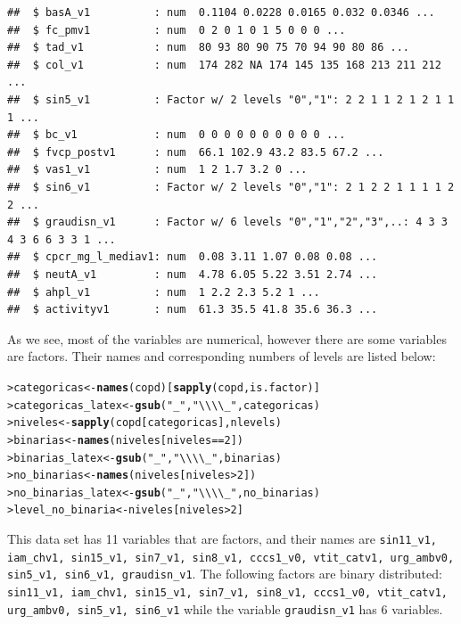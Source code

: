 \documentclass[10pt,a4paper,twoside]{article}\usepackage[]{graphicx}\usepackage[]{xcolor}
\makeatletter
\newcommand{\hlnum}[1]{\textcolor[rgb]{0.686,0.059,0.569}{#1}}%
\newcommand{\hlsng}[1]{\textcolor[rgb]{0.192,0.494,0.8}{#1}}%
\newcommand{\hlopt}[1]{\textcolor[rgb]{0,0,0}{#1}}%
\newcommand{\hldef}[1]{\textcolor[rgb]{0.345,0.345,0.345}{#1}}%
\newcommand{\hlkwb}[1]{\textcolor[rgb]{0.69,0.353,0.396}{#1}}%
\newcommand{\hlkwd}[1]{\textcolor[rgb]{0.737,0.353,0.396}{\textbf{#1}}}%
\newenvironment{kframe}{%
 \def\at@end@of@kframe{}%
 \ifinner\ifhmode%
  \def\at@end@of@kframe{\end{minipage}}%
  \begin{minipage}{\columnwidth}%
 \fi\fi%
 \def\FrameCommand##1{\hskip\@totalleftmargin \hskip-\fboxsep
 \colorbox{shadecolor}{##1}\hskip-\fboxsep
     \hskip-\linewidth \hskip-\@totalleftmargin \hskip\columnwidth}%
 \MakeFramed {\advance\hsize-\width
   \@totalleftmargin\z@ \linewidth\hsize
   \@setminipage}}%
 {\par\unskip\endMakeFramed%
 \at@end@of@kframe}
\newenvironment{knitrout}{}{} %
\makeatother
\begin{document}
\begin{knitrout}
\begin{kframe}
\begin{verbatim}
##  $ basA_v1          : num  0.1104 0.0228 0.0165 0.032 0.0346 ...
##  $ fc_pmv1          : num  0 2 0 1 0 1 5 0 0 0 ...
##  $ tad_v1           : num  80 93 80 90 75 70 94 90 80 86 ...
##  $ col_v1           : num  174 282 NA 174 145 135 168 213 211 212 ...
##  $ sin5_v1          : Factor w/ 2 levels "0","1": 2 2 1 1 2 1 2 1 1 1 ...
##  $ bc_v1            : num  0 0 0 0 0 0 0 0 0 0 ...
##  $ fvcp_postv1      : num  66.1 102.9 43.2 83.5 67.2 ...
##  $ vas1_v1          : num  1 2 1.7 3.2 0 ...
##  $ sin6_v1          : Factor w/ 2 levels "0","1": 2 1 2 2 1 1 1 1 2 2 ...
##  $ graudisn_v1      : Factor w/ 6 levels "0","1","2","3",..: 4 3 3 4 3 6 6 3 3 1 ...
##  $ cpcr_mg_l_mediav1: num  0.08 3.11 1.07 0.08 0.08 ...
##  $ neutA_v1         : num  4.78 6.05 5.22 3.51 2.74 ...
##  $ ahpl_v1          : num  1 2.2 2.3 5.2 1 ...
##  $ activityv1       : num  61.3 35.5 41.8 35.6 36.3 ...
\end{verbatim}
\end{kframe}
\end{knitrout}

As we see, most of the variables are numerical, however there are some variables are factors. Their names and corresponding numbers of levels are listed below:
\begin{knitrout}\footnotesize
{}\color{fgcolor}\begin{kframe}
\begin{alltt}
\hldef{> }\hldef{categoricas} \hlkwb{<-} \hlkwd{names}\hldef{(copd)[}\hlkwd{sapply}\hldef{(copd, is.factor)]}
\hldef{> }\hldef{categoricas_latex} \hlkwb{<-} \hlkwd{gsub}\hldef{(}\hlsng{"_"}\hldef{,} \hlsng{"\textbackslash{}\textbackslash{}\textbackslash{}\textbackslash{}_"}\hldef{, categoricas)}
\hldef{> }\hldef{niveles} \hlkwb{<-} \hlkwd{sapply}\hldef{(copd[categoricas], nlevels)}
\hldef{> }\hldef{binarias} \hlkwb{<-} \hlkwd{names}\hldef{(niveles[niveles} \hlopt{==} \hlnum{2}\hldef{])}
\hldef{> }\hldef{binarias_latex} \hlkwb{<-} \hlkwd{gsub}\hldef{(}\hlsng{"_"}\hldef{,} \hlsng{"\textbackslash{}\textbackslash{}\textbackslash{}\textbackslash{}_"}\hldef{, binarias)}
\hldef{> }\hldef{no_binarias} \hlkwb{<-} \hlkwd{names}\hldef{(niveles[niveles} \hlopt{>} \hlnum{2}\hldef{])}
\hldef{> }\hldef{no_binarias_latex} \hlkwb{<-} \hlkwd{gsub}\hldef{(}\hlsng{"_"}\hldef{,} \hlsng{"\textbackslash{}\textbackslash{}\textbackslash{}\textbackslash{}_"}\hldef{, no_binarias)}
\hldef{> }\hldef{level_no_binaria} \hlkwb{<-} \hldef{niveles[niveles} \hlopt{>} \hlnum{2}\hldef{]}
\end{alltt}
\end{kframe}
\end{knitrout}
This data set has 11 variables that are
factors, and their names are \texttt{sin11\_v1, iam\_chv1, sin15\_v1, sin7\_v1, sin8\_v1, cccs1\_v0, vtit\_catv1, urg\_ambv0, sin5\_v1, sin6\_v1, graudisn\_v1}. The following factors are binary distributed: \texttt{sin11\_v1, iam\_chv1, sin15\_v1, sin7\_v1, sin8\_v1, cccs1\_v0, vtit\_catv1, urg\_ambv0, sin5\_v1, sin6\_v1} while the variable  \texttt{graudisn\_v1} has 6 variables.
\end{document}
